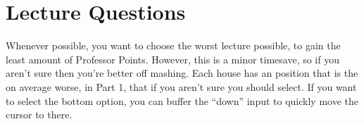 \newcommand{\answerline}[5]{\multicolumn{1}{|c|}{\cellcolor{gray!75}#1} & \multicolumn{1}{c|}{#2} & \multicolumn{1}{c|}{#3} & \multicolumn{1}{c|}{#4} & \multicolumn{1}{c|}{#5} \\ \hline}

\section*{Lecture Questions}

Whenever possible, you want to choose the worst lecture possible, to gain the least amount of Professor Points. However, this is a minor timesave, so if you aren't sure then you're better off mashing. Each house has an position that is the on average worse, in Part 1, that if you aren't sure you should select. If you want to select the bottom option, you can buffer the ``down'' input to quickly move the cursor to there.
